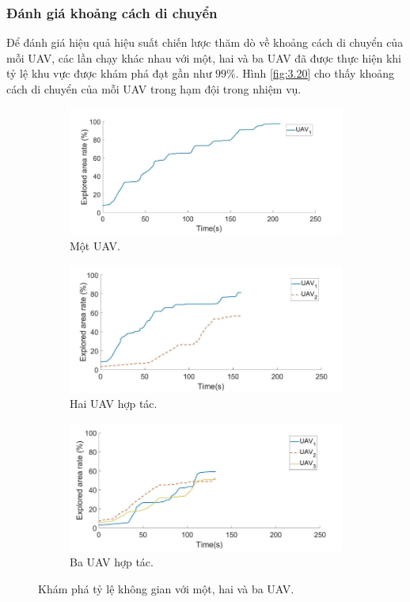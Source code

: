 \documentclass[11pt,openany]{book}
\begin{document}
\subsubsection{Đánh giá khoảng cách di chuyển}
Để đánh giá hiệu quả hiệu suất chiến lược thăm dò về khoảng cách di chuyển của mỗi UAV, các lần chạy khác nhau với một, hai và ba UAV đã được thực hiện khi tỷ lệ khu vực được khám phá đạt gần như $99\%$. Hình \ref{fig:3.20} cho thấy khoảng cách di chuyển của mỗi UAV trong hạm đội trong nhiệm vụ.
\begin{figure}[H]
    \centering
    \begin{subfigure}[H]{0.7\linewidth}
        \includegraphics[width=\linewidth]{assets/3_18_a.png}
        \caption{{Một UAV.}}
        \label{fig:3.18a}
    \end{subfigure}
    \begin{subfigure}[H]{0.7\linewidth}
        \includegraphics[width=\linewidth]{assets/3_18_b.png}
        \caption{{Hai UAV hợp tác.}}
        \label{fig:3.18b}
    \end{subfigure}
    \begin{subfigure}[H]{0.7\linewidth}
        \includegraphics[width=\linewidth]{assets/3_18_c.png}
        \caption{{Ba UAV hợp tác.}}
        \label{fig:3.18c}
    \end{subfigure}
    \caption{Khám phá tỷ lệ không gian với một, hai và ba UAV.}
    \label{fig:3.18}
\end{figure}
\end{document}
